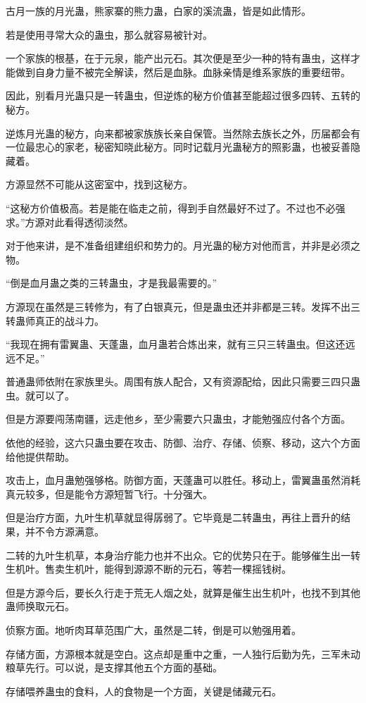 \begin{this_body}
古月一族的月光蛊，熊家寨的熊力蛊，白家的溪流蛊，皆是如此情形。

若是使用寻常大众的蛊虫，那么就容易被针对。

一个家族的根基，在于元泉，能产出元石。其次便是至少一种的特有蛊虫，这样才能做到自身力量不被完全解读，然后是血脉。血脉亲情是维系家族的重要纽带。

因此，别看月光蛊只是一转蛊虫，但逆炼的秘方价值甚至能超过很多四转、五转的秘方。

逆炼月光蛊的秘方，向来都被家族族长亲自保管。当然除去族长之外，历届都会有一位最忠心的家老，秘密知晓此秘方。同时记载月光蛊秘方的照影蛊，也被妥善隐藏着。

方源显然不可能从这密室中，找到这秘方。

“这秘方价值极高。若是能在临走之前，得到手自然最好不过了。不过也不必强求。”方源对此看得透彻淡然。

对于他来讲，是不准备组建组织和势力的。月光蛊的秘方对他而言，并非是必须之物。

“倒是血月蛊之类的三转蛊虫，才是我最需要的。”

方源现在虽然是三转修为，有了白银真元，但是蛊虫还并非都是三转。发挥不出三转蛊师真正的战斗力。

“我现在拥有雷翼蛊、天蓬蛊，血月蛊若合炼出来，就有三只三转蛊虫。但这还远远不足。”

普通蛊师依附在家族里头。周围有族人配合，又有资源配给，因此只需要三四只蛊虫。就可以了。

但是方源要闯荡南疆，远走他乡，至少需要六只蛊虫，才能勉强应付各个方面。

依他的经验，这六只蛊虫要在攻击、防御、治疗、存储、侦察、移动，这六个方面给他提供帮助。

攻击上，血月蛊勉强够格。防御方面，天蓬蛊可以胜任。移动上，雷翼蛊虽然消耗真元较多，但是能令方源短暂飞行。十分强大。

但是治疗方面，九叶生机草就显得孱弱了。它毕竟是二转蛊虫，再往上晋升的结果，并不令方源满意。

二转的九叶生机草，本身治疗能力也并不出众。它的优势只在于。能够催生出一转生机叶。售卖生机叶，能得到源源不断的元石，等若一棵摇钱树。

但是方源今后，要长久行走于荒无人烟之处，就算是催生出生机叶，也找不到其他蛊师换取元石。

侦察方面。地听肉耳草范围广大，虽然是二转，倒是可以勉强用着。

存储方面，方源根本就是空白。这点却是重中之重，一人独行后勤为先，三军未动粮草先行。可以说，是支撑其他五个方面的基础。

存储喂养蛊虫的食料，人的食物是一个方面，关键是储藏元石。


\end{this_body}
